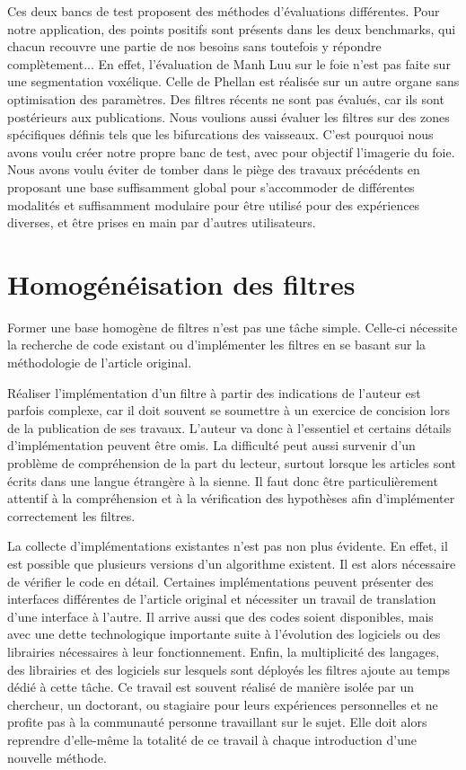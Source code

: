 Ces deux bancs de test proposent des méthodes d'évaluations différentes. Pour notre application, des points positifs sont présents dans les deux benchmarks, qui chacun recouvre une partie de nos besoins sans toutefois y répondre complètement... En effet, l'évaluation de Manh Luu sur le foie n'est pas faite sur une segmentation voxélique. Celle de Phellan est réalisée sur un autre organe sans optimisation des paramètres. Des filtres récents ne sont pas évalués, car ils sont postérieurs aux publications. Nous voulions aussi évaluer les filtres sur des zones spécifiques définis tels que les bifurcations des vaisseaux. C'est pourquoi nous avons voulu créer notre propre banc de test, avec pour objectif l'imagerie du foie. Nous avons voulu éviter de tomber dans le piège des travaux précédents en proposant une base suffisamment global pour s'accommoder de différentes modalités et suffisamment modulaire pour être utilisé pour des expériences diverses, et être prises en main par d'autres utilisateurs.

\section{Homogénéisation des filtres}
\label{sec:Filtres}

Former une base homogène de filtres n'est pas une tâche simple. Celle-ci nécessite la recherche de code existant ou d'implémenter les filtres en se basant sur la méthodologie de l'article original.

Réaliser l'implémentation d'un filtre à partir des indications de l'auteur est parfois complexe, car il doit souvent se soumettre à un exercice de concision lors de la publication de ses travaux. L'auteur va donc à l'essentiel et certains détails d'implémentation peuvent être omis. La difficulté peut aussi survenir d'un problème de compréhension de la part du lecteur, surtout lorsque les articles sont écrits dans une langue étrangère à la sienne. Il faut donc être particulièrement attentif à la compréhension et à la vérification des hypothèses afin d'implémenter correctement les filtres. 

La collecte d'implémentations existantes n'est pas non plus évidente. En effet, il est possible que plusieurs versions d'un algorithme existent. Il est alors nécessaire de vérifier le code en détail. Certaines implémentations peuvent présenter des interfaces différentes de l'article original et nécessiter un travail de translation d'une interface à l'autre. Il arrive aussi que des codes soient disponibles, mais avec une dette technologique importante suite à l'évolution des logiciels ou des librairies nécessaires à leur fonctionnement. Enfin, la multiplicité des langages, des librairies et des logiciels sur lesquels sont déployés les filtres ajoute au temps dédié à cette tâche. Ce travail est souvent réalisé de manière isolée par un chercheur, un doctorant, ou stagiaire pour leurs expériences personnelles et ne profite pas à la communauté personne travaillant sur le sujet. Elle doit alors reprendre d'elle-même la totalité de ce travail à chaque introduction d'une nouvelle méthode.

